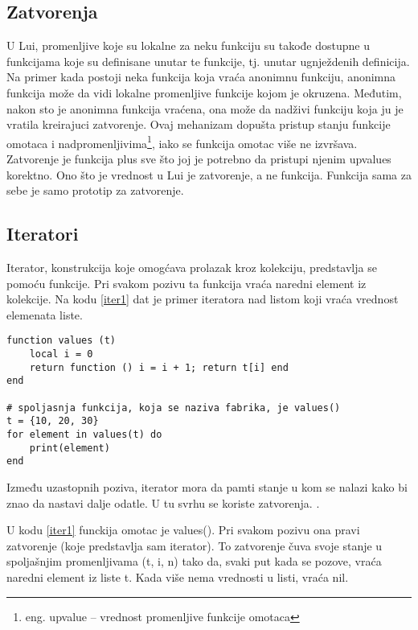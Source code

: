 \documentclass[a4paper]{article}
\begin{document}


\subsection{Zatvorenja}
\label{sec:zatvorenja}


U Lui, promenljive koje su lokalne za neku funkciju su takođe dostupne u funkcijama koje su definisane unutar te funkcije, tj. unutar ugnježdenih definicija. Na primer kada postoji neka funkcija koja vraća anonimnu funkciju, anonimna funkcija može da vidi lokalne promenljive funkcije kojom je okruzena. Međutim, nakon sto je anonimna funkcija vraćena, ona može da nadživi funkciju koja ju je vratila kreirajuci zatvorenje. Ovaj mehanizam dopušta pristup stanju funkcije omotaca i nadpromenljivima\footnote{eng. upvalue -- vrednost promenljive funkcije omotaca}, iako se funkcija omotac više ne izvršava.
Zatvorenje je funkcija plus sve što joj je potrebno da pristupi njenim upvalues korektno. Ono što je vrednost u Lui je zatvorenje, a ne funkcija. Funkcija sama za sebe je samo prototip za zatvorenje.


\subsection{Iteratori}
\label{sec:iteratori}


Iterator, konstrukcija koje omogćava prolazak kroz kolekciju, predstavlja se pomoću funkcije. Pri svakom pozivu ta funkcija vraća naredni element iz kolekcije. Na kodu \ref{iter1} dat je primer iteratora nad listom koji vraća vrednost elemenata liste.

\begin{lstlisting}[caption={Primer iteratora nad listom},frame=single, label=iter1]
function values (t)
	local i = 0
	return function () i = i + 1; return t[i] end
end

# spoljasnja funkcija, koja se naziva fabrika, je values()
t = {10, 20, 30}
for element in values(t) do
	print(element)
end
\end{lstlisting}

Između uzastopnih poziva, iterator mora da pamti stanje u kom se nalazi kako bi znao da nastavi dalje odatle. U tu svrhu se koriste zatvorenja. \cite{lua_org_iterators}.

U kodu \ref{iter1} funckija omotac je values(). Pri svakom pozivu ona pravi zatvorenje (koje predstavlja sam iterator). To zatvorenje čuva svoje stanje u spoljašnjim promenljivama (t, i, n) tako da, svaki put kada se pozove, vraća naredni element iz liste t. Kada više nema vrednosti u listi, vraća nil.
\end{document}
